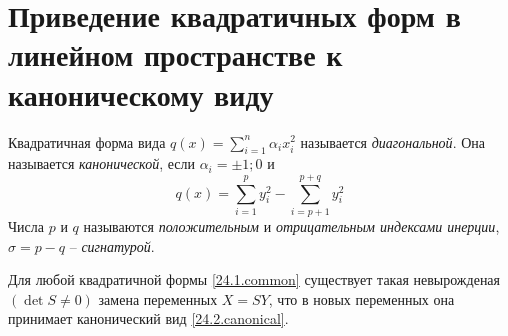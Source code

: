   \section{Приведение квадратичных форм в линейном пространстве к каноническому виду}
  \begin{defn}
  Квадратичная форма вида $q(x)=\sum\limits_{i=1}^n\alpha_ix_i^2$ называется \textit{диагональной}. Она называется \textit{канонической}, если $\alpha_i=\pm 1;0$ и 
  \begin{equation}\label{24.2.canonical}
  q(x)=\sum\limits_{i=1}^py_i^2-\sum\limits_{i=p+1}^{p+q}y_i^2
  \end{equation} 
  Числа $p$ и $q$ называются \textit{положительным} и \textit{отрицательным индексами инерции}, $\sigma=p-q$ -- \textit{сигнатурой}.
  \end{defn}
  \begin{thm}
  Для любой квадратичной формы \eqref{24.1.common} существует такая невырожденая $(\det S \neq 0)$ замена переменных $X=SY$, что в новых переменных она принимает канонический вид \eqref{24.2.canonical}.
  \end{thm}
